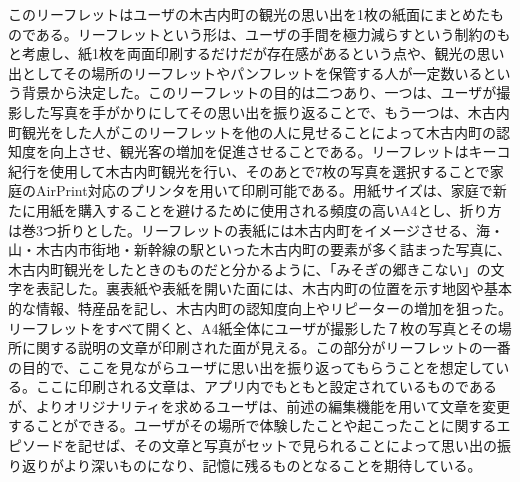 このリーフレットはユーザの木古内町の観光の思い出を1枚の紙面にまとめたものである。リーフレットという形は、ユーザの手間を極力減らすという制約のもと考慮し、紙1枚を両面印刷するだけだが存在感があるという点や、観光の思い出としてその場所のリーフレットやパンフレットを保管する人が一定数いるという背景から決定した。このリーフレットの目的は二つあり、一つは、ユーザが撮影した写真を手がかりにしてその思い出を振り返ることで、もう一つは、木古内町観光をした人がこのリーフレットを他の人に見せることによって木古内町の認知度を向上させ、観光客の増加を促進させることである。リーフレットはキーコ紀行を使用して木古内町観光を行い、そのあとで7枚の写真を選択することで家庭のAirPrint対応のプリンタを用いて印刷可能である。用紙サイズは、家庭で新たに用紙を購入することを避けるために使用される頻度の高いA4とし、折り方は巻3つ折りとした。リーフレットの表紙には木古内町をイメージさせる、海・山・木古内市街地・新幹線の駅といった木古内町の要素が多く詰まった写真に、木古内町観光をしたときのものだと分かるように、「みそぎの郷きこない」の文字を表記した。裏表紙や表紙を開いた面には、木古内町の位置を示す地図や基本的な情報、特産品を記し、木古内町の認知度向上やリピーターの増加を狙った。リーフレットをすべて開くと、A4紙全体にユーザが撮影した７枚の写真とその場所に関する説明の文章が印刷された面が見える。この部分がリーフレットの一番の目的で、ここを見ながらユーザに思い出を振り返ってもらうことを想定している。ここに印刷される文章は、アプリ内でもともと設定されているものであるが、よりオリジナリティを求めるユーザは、前述の編集機能を用いて文章を変更することができる。ユーザがその場所で体験したことや起こったことに関するエピソードを記せば、その文章と写真がセットで見られることによって思い出の振り返りがより深いものになり、記憶に残るものとなることを期待している。

